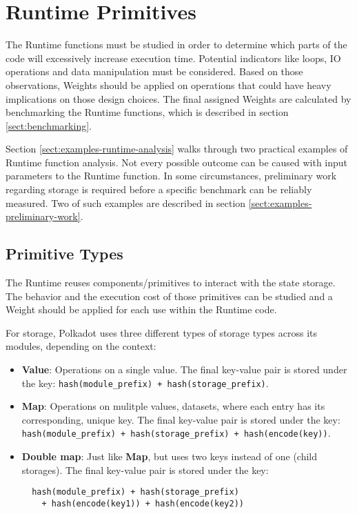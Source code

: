 \documentclass[11pt,a4paper]{article}
\begin{document}
\section{Runtime Primitives}
The Runtime functions must be studied in order to determine which parts of the code will excessively
increase execution time. Potential indicators like loops, IO operations and data manipulation must
be considered. Based on those observations, Weights should be applied on operations
that could have heavy implications on those design choices. The final assigned Weights are calculated
by benchmarking the Runtime functions, which is described in section \ref{sect:benchmarking}.
\newline

Section \ref{sect:examples-runtime-analysis} walks through two practical examples of Runtime function
analysis.
Not every possible outcome can be caused with input parameters to the Runtime function.
In some circumstances, preliminary work regarding
storage is required before a specific benchmark can be reliably measured.
Two of such examples are described in section \ref{sect:examples-preliminary-work}.

\subsection{Primitive Types}\label{sect:primitive-types}
The Runtime reuses components/primitives to interact with the state storage. The behavior and
the execution cost of those primitives can be studied and a Weight should be applied for each use
within the Runtime code.
\newline

For storage, Polkadot uses three different types of storage types across its modules, depending on the
context:

\begin{itemize}
  \item \textbf{Value}: Operations on a single value.
  \newline\newline
  The final key-value pair is stored under the key:\newline
  \verb|hash(module_prefix) + hash(storage_prefix)|.
  \item \textbf{Map}: Operations on mulitple values, datasets, where each entry has its
  corresponding, unique key.
  \newline\newline
  The final key-value pair is stored under the key:\newline
  \verb|hash(module_prefix) + hash(storage_prefix) + hash(encode(key))|.
  \newpage
  \item \textbf{Double map}: Just like \textbf{Map}, but uses two keys instead of one 
  (child storages).
  \newline\newline
  The final key-value pair is stored under the key:\newline
  \begin{verbatim}
  hash(module_prefix) + hash(storage_prefix)
    + hash(encode(key1)) + hash(encode(key2))
  \end{verbatim}
\end{itemize}
\end{document}
